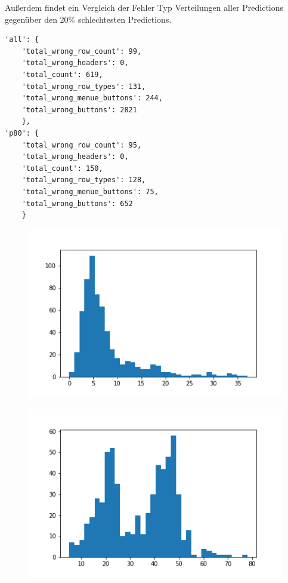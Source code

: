 \documentclass[pdftex,a4paper,halfparskip, article]{scrartcl}
\begin{document}
Außerdem findet ein Vergleich der Fehler Typ Verteilungen aller Predictions gegenüber den 20\% schlechtesten Predictions.

\begin{verbatim}
'all': {
    'total_wrong_row_count': 99,
    'total_wrong_headers': 0, 
    'total_count': 619, 
    'total_wrong_row_types': 131, 
    'total_wrong_menue_buttons': 244, 
    'total_wrong_buttons': 2821
    },
'p80': {
    'total_wrong_row_count': 95, 
    'total_wrong_headers': 0, 
    'total_count': 150, 
    'total_wrong_row_types': 128, 
    'total_wrong_menue_buttons': 75, 
    'total_wrong_buttons': 652
    }
\end{verbatim}

\begin{figure}
\centering
\begin{minipage}{.5\textwidth}
  \centering
  \includegraphics[width=.8\linewidth]{predictions_bin10_histogramm}
  \label{fig:bsp_plot_good}
\end{minipage}%
\begin{minipage}{.5\textwidth}
  \centering
  \includegraphics[width=.8\linewidth]{predictions_bin12_histogramm}
  \label{fig:bsp_plot_bad}
\end{minipage}
\end{figure}
\end{document}
